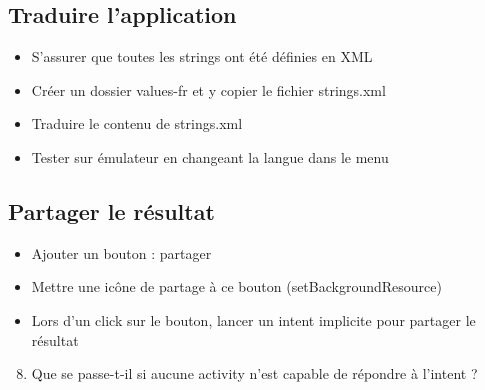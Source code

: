 \documentclass{article}
\begin{document}
\subsection{Traduire l'application}
\begin{itemize}
\item S'assurer que toutes les strings ont été définies en XML
\item Créer un dossier values-fr et y copier le fichier strings.xml
\item Traduire le contenu de strings.xml
\item Tester sur émulateur en changeant la langue dans le menu
\end{itemize}
\subsection{Partager le résultat}
\begin{itemize}
\item Ajouter un bouton : partager
\item Mettre une icône de partage à ce bouton (setBackgroundResource)
\item Lors d'un click sur le bouton, lancer un intent implicite pour partager le résultat
\end{itemize}
\begin{enumerate}
 \setcounter{enumi}{7}
\item Que se passe-t-il si aucune activity n'est capable de répondre à l'intent
?
\end{enumerate}
\end{document}
